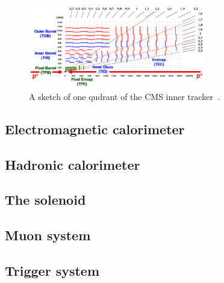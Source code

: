 \begin{figure}[hbtp]
 \centering
 \includegraphics[width=0.69\textwidth]{figures/general/tracker.png}
 \caption{A sketch of one qudrant of the CMS inner tracker~\cite{TrackerPicture}.}
 \label{fig:tracker}
\end{figure}

\subsection{Electromagnetic calorimeter}
\subsection{Hadronic calorimeter}
\subsection{The solenoid}
\subsection{Muon system}
\subsection{Trigger system}
